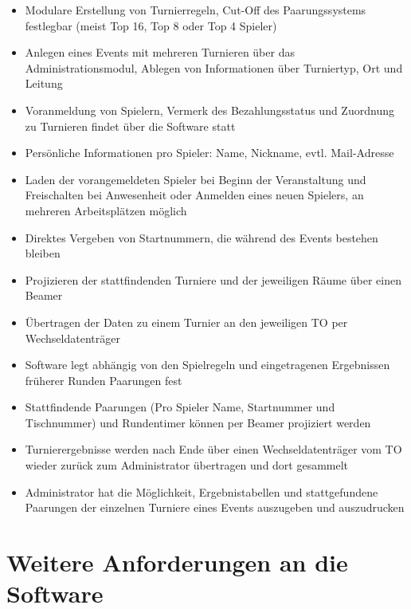 \documentclass[11pt]{article}
\begin{document}
\begin{itemize}
	\item Modulare Erstellung von Turnierregeln, Cut-Off des Paarungssystems festlegbar (meist Top 16, Top 8 oder Top 4 Spieler)
	\item Anlegen eines Events mit mehreren Turnieren über das Administrationsmodul, Ablegen von Informationen über Turniertyp, Ort und Leitung
	\item Voranmeldung von Spielern, Vermerk des Bezahlungsstatus und Zuordnung zu Turnieren findet über die Software statt
	\item Persönliche Informationen pro Spieler: Name, Nickname, evtl. Mail-Adresse
	\item Laden der vorangemeldeten Spieler bei Beginn der Veranstaltung und Freischalten bei Anwesenheit oder Anmelden eines neuen Spielers, an mehreren Arbeitsplätzen möglich
	\item Direktes Vergeben von Startnummern, die während des Events bestehen bleiben
	\item Projizieren der stattfindenden Turniere und der jeweiligen Räume über einen Beamer
	\item Übertragen der Daten zu einem Turnier an den jeweiligen TO per Wechseldatenträger
	\item Software legt abhängig von den Spielregeln und eingetragenen Ergebnissen früherer Runden Paarungen fest
	\item Stattfindende Paarungen (Pro Spieler Name, Startnummer und Tischnummer) und Rundentimer können per Beamer projiziert werden
	\item Turnierergebnisse werden nach Ende über einen Wechseldatenträger vom TO wieder zurück zum Administrator übertragen und dort gesammelt
	\item Administrator hat die Möglichkeit, Ergebnistabellen und stattgefundene Paarungen der einzelnen Turniere eines Events auszugeben und auszudrucken
\end{itemize}

\newpage
\section{Weitere Anforderungen an die Software}
\end{document}
